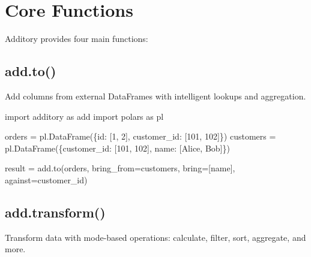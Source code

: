 \documentclass[
  letterpaper,
]{scrbook}
\newenvironment{Shaded}{\begin{snugshade}}{\end{snugshade}}
\newcommand{\DecValTok}[1]{\textcolor[rgb]{0.68,0.00,0.00}{#1}}
\newcommand{\ImportTok}[1]{\textcolor[rgb]{0.00,0.46,0.62}{#1}}
\newcommand{\NormalTok}[1]{\textcolor[rgb]{0.00,0.23,0.31}{#1}}
\newcommand{\OperatorTok}[1]{\textcolor[rgb]{0.37,0.37,0.37}{#1}}
\newcommand{\StringTok}[1]{\textcolor[rgb]{0.13,0.47,0.30}{#1}}
\begin{document}
\section{Core Functions}\label{core-functions-1}

Additory provides four main functions:

\subsection{add.to()}\label{add.to}

Add columns from external DataFrames with intelligent lookups and
aggregation.

\begin{Shaded}
\begin{Highlighting}[]
\ImportTok{import}\NormalTok{ additory }\ImportTok{as}\NormalTok{ add}
\ImportTok{import}\NormalTok{ polars }\ImportTok{as}\NormalTok{ pl}

\NormalTok{orders }\OperatorTok{=}\NormalTok{ pl.DataFrame(\{}\StringTok{\textquotesingle{}id\textquotesingle{}}\NormalTok{: [}\DecValTok{1}\NormalTok{, }\DecValTok{2}\NormalTok{], }\StringTok{\textquotesingle{}customer\_id\textquotesingle{}}\NormalTok{: [}\DecValTok{101}\NormalTok{, }\DecValTok{102}\NormalTok{]\})}
\NormalTok{customers }\OperatorTok{=}\NormalTok{ pl.DataFrame(\{}\StringTok{\textquotesingle{}customer\_id\textquotesingle{}}\NormalTok{: [}\DecValTok{101}\NormalTok{, }\DecValTok{102}\NormalTok{], }\StringTok{\textquotesingle{}name\textquotesingle{}}\NormalTok{: [}\StringTok{\textquotesingle{}Alice\textquotesingle{}}\NormalTok{, }\StringTok{\textquotesingle{}Bob\textquotesingle{}}\NormalTok{]\})}

\NormalTok{result }\OperatorTok{=}\NormalTok{ add.to(orders, bring\_from}\OperatorTok{=}\NormalTok{customers, bring}\OperatorTok{=}\NormalTok{[}\StringTok{\textquotesingle{}name\textquotesingle{}}\NormalTok{], against}\OperatorTok{=}\StringTok{\textquotesingle{}customer\_id\textquotesingle{}}\NormalTok{)}
\end{Highlighting}
\end{Shaded}

\subsection{add.transform()}\label{add.transform}

Transform data with mode-based operations: calculate, filter, sort,
aggregate, and more.
\end{document}
